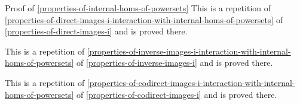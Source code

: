 \begin{Proof}{Proof of \cref{properties-of-internal-homs-of-powersets}}
    This is a repetition of \cref{properties-of-direct-images-i-interaction-with-internal-homs-of-powersets} of \cref{properties-of-direct-images-i} and is proved there.

    This is a repetition of \cref{properties-of-inverse-images-i-interaction-with-internal-homs-of-powersets} of \cref{properties-of-inverse-images-i} and is proved there.

    This is a repetition of \cref{properties-of-codirect-images-i-interaction-with-internal-homs-of-powersets} of \cref{properties-of-codirect-images-i} and is proved there.
\end{Proof}

